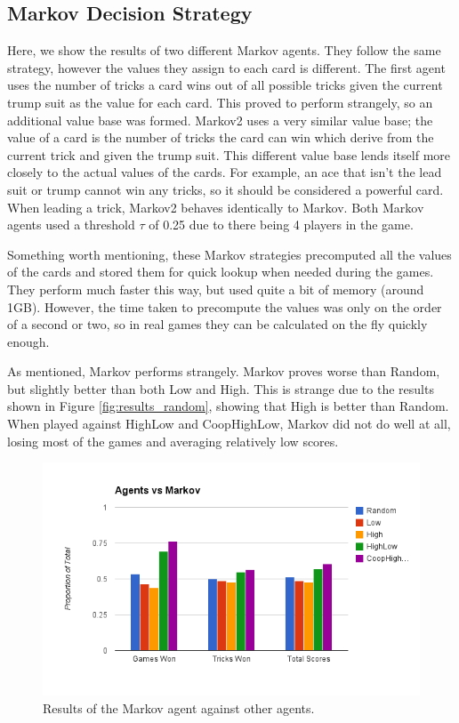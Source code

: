 \subsection{Markov Decision Strategy}

Here, we show the results of two different Markov agents. They follow the same strategy, however the values they assign to each card
is different. The first agent uses the number of tricks a card wins out of all possible tricks given the current trump suit as the value for
each card. This proved to perform strangely, so an additional value base was formed. Markov2 uses a very similar value base; the value of
a card is the number of tricks the card can win which derive from the current trick and given the trump suit. This different value
base lends itself more closely to the actual values of the cards. For example, an ace that isn't the lead suit or trump cannot win any tricks,
so it should be considered a powerful card. When leading a trick, Markov2 behaves identically to Markov. Both Markov agents used a threshold $\tau$
of 0.25 due to there being 4 players in the game.

Something worth mentioning, these Markov strategies precomputed all the values of the cards and stored them for quick lookup when needed during
the games. They perform much faster this way, but used quite a bit of memory (around 1GB). However, the time taken to precompute the values
was only on the order of a second or two, so in real games they can be calculated on the fly quickly enough.

As mentioned, Markov performs strangely. Markov proves worse than Random, but slightly better than both Low and High. This is strange due to
the results shown in Figure \ref{fig:results_random}, showing that High is better than Random. When played against HighLow and CoopHighLow, Markov
did not do well at all, losing most of the games and averaging relatively low scores.

\begin{figure}[h]
    \centering
    \includegraphics[scale=0.5]{data/markov.png}
    \caption{Results of the Markov agent against other agents.}
    \label{fig:results_markov}
\end{figure}

